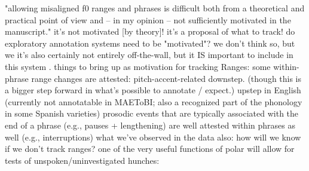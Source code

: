 \markdownRendererUlEndTight \markdownRendererUlItemEnd 
\markdownRendererUlItem "allowing misaligned f0 ranges and phrases is difficult both from a theoretical and practical point of view and – in my opinion – not sufficiently motivated in the manuscript."\markdownRendererInterblockSeparator
{}\markdownRendererUlBeginTight
\markdownRendererUlItem it's not motivated [by theory]! it's a proposal of what to track!\markdownRendererUlItemEnd 
\markdownRendererUlItem do exploratory annotation systems need to be "motivated"?\markdownRendererInterblockSeparator
{}\markdownRendererUlBeginTight
\markdownRendererUlItem we don't think so, but we \markdownRendererUlItemEnd 
\markdownRendererUlItem it's also certainly not entirely off-the-wall, but it IS important to include in this system .\markdownRendererUlItemEnd 
\markdownRendererUlItem things to bring up as motivation for tracking Ranges:\markdownRendererInterblockSeparator
{}\markdownRendererUlBeginTight
\markdownRendererUlItem some within-phrase range changes are attested:\markdownRendererInterblockSeparator
{}\markdownRendererUlBeginTight
\markdownRendererUlItem pitch-accent-related downstep. (though this is a bigger step forward in what's possible to annotate / expect.)\markdownRendererUlItemEnd 
\markdownRendererUlItem upstep in English (currently not annotatable in MAE\markdownRendererUnderscore{}ToBI; also a recognized part of the phonology in some Spanish varieties)\markdownRendererUlItemEnd 
\markdownRendererUlEndTight \markdownRendererUlItemEnd 
\markdownRendererUlItem prosodic events that are typically associated with the end of a phrase (e.g., pauses + lengthening) are well attested within phrases as well (e.g., interruptions)\markdownRendererUlItemEnd 
\markdownRendererUlItem what we've observed in the data\markdownRendererInterblockSeparator
{}\markdownRendererUlBeginTight
\markdownRendererUlItem {}\markdownRendererUlItemEnd 
\markdownRendererUlEndTight \markdownRendererUlItemEnd 
\markdownRendererUlEndTight \markdownRendererUlItemEnd 
\markdownRendererUlItem also: how will we know if we don't track ranges?\markdownRendererInterblockSeparator
{}\markdownRendererUlBeginTight
\markdownRendererUlItem one of the very useful functions of polar will allow for tests of unspoken/uninvestigated hunches:\markdownRendererUlItemEnd 
\markdownRendererUlEndTight \markdownRendererUlItemEnd 
